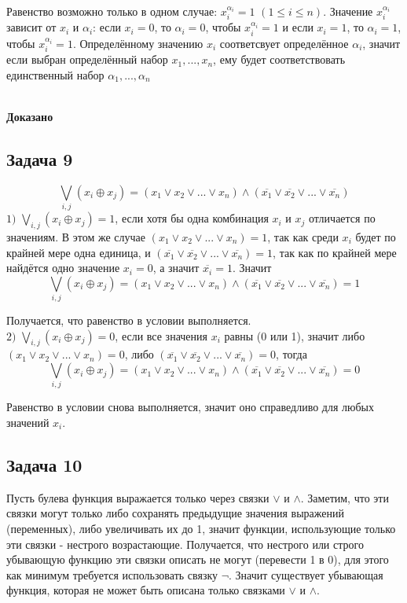 \documentclass[a4paper,14pt]{article} %
\begin{document}
Равенство возможно только в одном случае: $x_i^{\alpha_i}=1$ $(1\leqslant i\leqslant n)$. Значение $x_i^{\alpha_i}$ зависит от $x_i$ и $\alpha_i$: если $x_i=0$, то $\alpha_i=0$, чтобы $x_i^{\alpha_i}=1$ и если $x_i=1$, то $\alpha_i=1$, чтобы $x_i^{\alpha_i}=1$. Определённому значению $x_i$ соответсвует определённое $\alpha_i$, значит если выбран определённый набор $x_1,...,x_n$, ему будет соответствовать единственный набор $\alpha_1,...,\alpha_n$ \\\\
\begin{flushright}
\begin{large}
\textbf {Доказано}
\end{large}
\end{flushright}

\begin{center}
\subsection{Задача 9}
\end{center}
\[\bigvee \limits_{i, j} (x_i\oplus x_j)=(x_1\vee x_2 \vee ... \vee x_n)\wedge (\overline{x_1} \vee \overline{x_2} \vee ... \vee \overline{x_n}) \]
$1)$ $\bigvee \limits_{i, j} (x_i\oplus x_j)=1$, если хотя бы одна комбинация $x_i$ и $x_j$ отличается по значениям. В этом же случае $(x_1\vee x_2 \vee ... \vee x_n)=1$, так как среди $x_i$ будет по крайней мере одна единица, и $(\overline{x_1} \vee \overline{x_2} \vee ... \vee \overline{x_n})= 1$, так как по крайней мере найдётся одно значение $x_i=0$, а значит $\overline{x_i}=1$. Значит
\[\bigvee \limits_{i, j} (x_i\oplus x_j)=(x_1\vee x_2 \vee ... \vee x_n)\wedge (\overline{x_1} \vee \overline{x_2} \vee ... \vee \overline{x_n})=1 \]

Получается, что равенство в условии выполняется.\\
$2)$ $\bigvee \limits_{i, j} (x_i\oplus x_j)=0$, если все значения $x_i$ равны (0 или 1), значит либо $(x_1\vee x_2 \vee ... \vee x_n)=0$, либо $(\overline{x_1} \vee \overline{x_2} \vee ... \vee \overline{x_n})= 0$, тогда
\[\bigvee \limits_{i, j} (x_i\oplus x_j)=(x_1\vee x_2 \vee ... \vee x_n)\wedge (\overline{x_1} \vee \overline{x_2} \vee ... \vee \overline{x_n})=0 \]

Равенство в условии снова выполняется, значит оно справедливо для любых значений $x_i$.

\newpage
\begin{center}
\subsection{Задача 10}
\end{center}
\par
Пусть булева функция выражается только через связки $\vee$ и $\wedge$. Заметим, что эти связки могут только либо сохранять предыдущие значения выражений (переменных), либо увеличивать их до 1, значит функции, использующие только эти связки - нестрого возрастающие. Получается, что нестрого или строго убывающую функцию эти связки описать не могут (перевести 1 в 0), для этого как минимум требуется использовать связку $\neg$.
Значит существует убывающая функция, которая не может быть описана только связками $\vee$ и $\wedge$.
\end{document}
